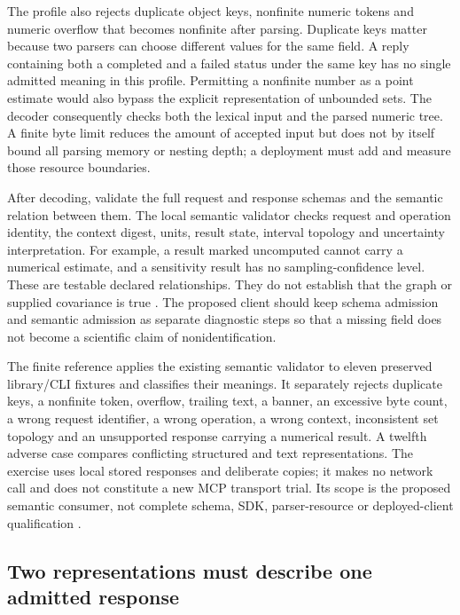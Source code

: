 The profile also rejects duplicate object keys, nonfinite numeric tokens and
numeric overflow that becomes nonfinite after parsing. Duplicate keys matter
because two parsers can choose different values for the same field. A reply
containing both a completed and a failed status under the same key has no
single admitted meaning in this profile. Permitting a nonfinite number as a
point estimate would also bypass the explicit representation of unbounded
sets. The decoder consequently checks both the lexical input and the parsed
numeric tree. A finite byte limit reduces the amount of accepted input but
does not by itself bound all parsing memory or nesting depth; a deployment
must add and measure those resource boundaries.

After decoding, validate the full request and response schemas and the
semantic relation between them. The local semantic validator checks request
and operation identity, the context digest, units, result state, interval
topology and uncertainty interpretation. For example, a result marked
uncomputed cannot carry a numerical estimate, and a sensitivity result has
no sampling-confidence level. These are testable declared relationships.
They do not establish that the graph or supplied covariance is true
\citep{exec13_i2_examples}. The proposed client should keep schema admission
and semantic admission as separate diagnostic steps so that a missing field
does not become a scientific claim of nonidentification.

The finite reference applies the existing semantic validator to eleven
preserved library/CLI fixtures and classifies their meanings. It separately
rejects duplicate keys, a nonfinite token, overflow, trailing text, a banner,
an excessive byte count, a wrong request identifier, a wrong operation,
a wrong context, inconsistent set topology and an unsupported response
carrying a numerical result. A twelfth adverse case compares conflicting
structured and text representations. The exercise uses local stored
responses and deliberate copies; it makes no network call and does not
constitute a new MCP transport trial. Its scope is the proposed semantic
consumer, not complete schema, SDK, parser-resource or deployed-client
qualification \citep{exec17_integration_review_reference}.

\subsection{Two representations must describe one admitted response}

